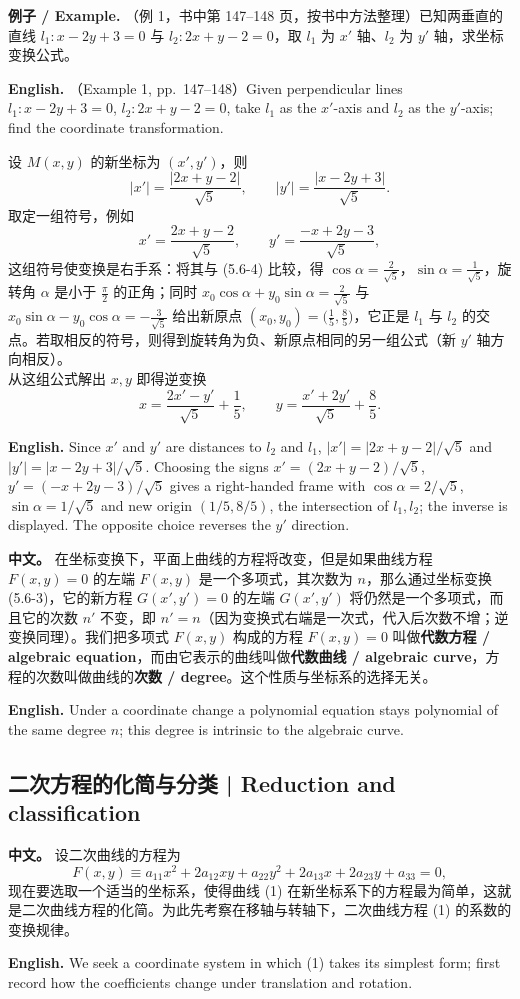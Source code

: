 \documentclass[UTF8,11pt,a4paper]{ctexart}
\newcommand{\APS}[2]{\par\noindent\textbf{中文。} #1\par\noindent\textbf{English.} #2\par\smallskip}
\newcommand{\EN}[1]{\par\noindent \textbf{English.} #1\par}
\newcommand{\EX}[2]{\par\noindent \textbf{例子 / Example.} #1\par\EN{#2}}
\theoremstyle{definition}
\begin{document}
\EX{（例 1，书中第 147--148 页，按书中方法整理）已知两垂直的直线 $l_1:x-2y+3=0$ 与 $l_2:2x+y-2=0$，取 $l_1$ 为 $x'$ 轴、$l_2$ 为 $y'$ 轴，求坐标变换公式。}{（Example 1, pp.~147--148）Given perpendicular lines $l_1:x-2y+3=0$, $l_2:2x+y-2=0$, take $l_1$ as the $x'$-axis and $l_2$ as the $y'$-axis; find the coordinate transformation.}
设 $M(x,y)$ 的新坐标为 $(x',y')$，则
\[
|x'|=\frac{|2x+y-2|}{\sqrt5},\qquad |y'|=\frac{|x-2y+3|}{\sqrt5}.
\]
取定一组符号，例如
\[
x'=\frac{2x+y-2}{\sqrt5},\qquad y'=\frac{-x+2y-3}{\sqrt5},
\]
这组符号使变换是右手系：将其与 (5.6-4) 比较，得 $\cos\alpha=\frac{2}{\sqrt5}$，$\sin\alpha=\frac{1}{\sqrt5}$，旋转角 $\alpha$ 是小于 $\frac{\pi}{2}$ 的正角；同时 $x_0\cos\alpha+y_0\sin\alpha=\frac{2}{\sqrt5}$ 与 $x_0\sin\alpha-y_0\cos\alpha=-\frac{3}{\sqrt5}$ 给出新原点 $(x_0,y_0)=\bigl(\frac15,\frac85\bigr)$，它正是 $l_1$ 与 $l_2$ 的交点。若取相反的符号，则得到旋转角为负、新原点相同的另一组公式（新 $y'$ 轴方向相反）。\\[2pt]
从这组公式解出 $x,y$ 即得逆变换
\[
x=\frac{2x'-y'}{\sqrt5}+\frac15,\qquad y=\frac{x'+2y'}{\sqrt5}+\frac85.
\]
\EN{Since $x'$ and $y'$ are distances to $l_2$ and $l_1$, $|x'|=|2x+y-2|/\sqrt5$ and $|y'|=|x-2y+3|/\sqrt5$. Choosing the signs $x'=(2x+y-2)/\sqrt5$, $y'=(-x+2y-3)/\sqrt5$ gives a right-handed frame with $\cos\alpha=2/\sqrt5$, $\sin\alpha=1/\sqrt5$ and new origin $(1/5,8/5)$, the intersection of $l_1,l_2$; the inverse is displayed. The opposite choice reverses the $y'$ direction.}

\APS{在坐标变换下，平面上曲线的方程将改变，但是如果曲线方程 $F(x,y)=0$ 的左端 $F(x,y)$ 是一个多项式，其次数为 $n$，那么通过坐标变换 (5.6-3)，它的新方程 $G(x',y')=0$ 的左端 $G(x',y')$ 将仍然是一个多项式，而且它的次数 $n'$ 不变，即 $n'=n$（因为变换式右端是一次式，代入后次数不增；逆变换同理）。我们把多项式 $F(x,y)$ 构成的方程 $F(x,y)=0$ 叫做\textbf{代数方程 / algebraic equation}，而由它表示的曲线叫做\textbf{代数曲线 / algebraic curve}，方程的次数叫做曲线的\textbf{次数 / degree}。这个性质与坐标系的选择无关。}{Under a coordinate change a polynomial equation stays polynomial of the same degree $n$; this degree is intrinsic to the algebraic curve.}

\subsection{二次方程的化简与分类 | Reduction and classification}
\APS{设二次曲线的方程为
\[
F(x,y)\equiv a_{11}x^2+2a_{12}xy+a_{22}y^2+2a_{13}x+2a_{23}y+a_{33}=0,\tag{1}
\]
现在要选取一个适当的坐标系，使得曲线 (1) 在新坐标系下的方程最为简单，这就是二次曲线方程的化简。为此先考察在移轴与转轴下，二次曲线方程 (1) 的系数的变换规律。}{We seek a coordinate system in which (1) takes its simplest form; first record how the coefficients change under translation and rotation.}
\end{document}
